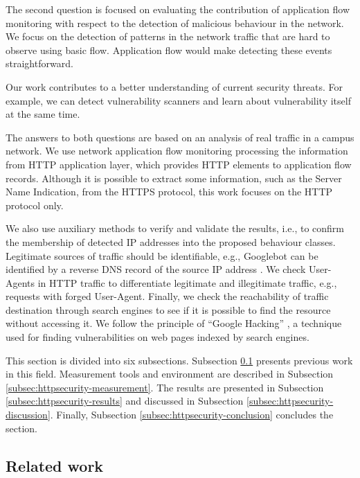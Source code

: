 The second question is focused on evaluating the contribution of application flow monitoring with respect to the detection of malicious behaviour in the network. We focus on the detection of patterns in the network traffic that are hard to observe using basic flow. Application flow would make detecting these events straightforward.

Our work contributes to a better understanding of current security threats. For example, we can detect vulnerability scanners and learn about vulnerability itself at the same time.

The answers to both questions are based on an analysis of real traffic in a campus network. We use network application flow monitoring processing the information from HTTP application layer, which provides HTTP elements to application flow records. Although it is possible to extract some information, such as the Server Name Indication, from the HTTPS protocol, this work focuses on the HTTP protocol only.

We also use auxiliary methods to verify and validate the results, i.e., to confirm the membership of detected IP addresses into the proposed behaviour classes. Legitimate sources of traffic should be identifiable, e.g., Googlebot can be identified by a reverse DNS record of the source IP address \cite{Google--Verifying}. We check User-Agents in HTTP traffic to differentiate legitimate and illegitimate traffic, e.g., requests with forged User-Agent. Finally, we check the reachability of traffic destination through search engines to see if it is possible to find the resource without accessing it. We follow the principle of ``Google Hacking'' \cite{Billig-2008-Evaluation}, a technique used for finding vulnerabilities on web pages indexed by search engines.

This section is divided into six subsections. Subsection \ref{subsec:httpsecurity-related_work} presents previous work in this field. Measurement tools and environment are described in Subsection \ref{subsec:httpsecurity-measurement}. The results are presented in Subsection \ref{subsec:httpsecurity-results} and discussed in Subsection \ref{subsec:httpsecurity-discussion}. Finally, Subsection \ref{subsec:httpsecurity-conclusion} concludes the section.

\subsection{Related work}\label{subsec:httpsecurity-related_work}

